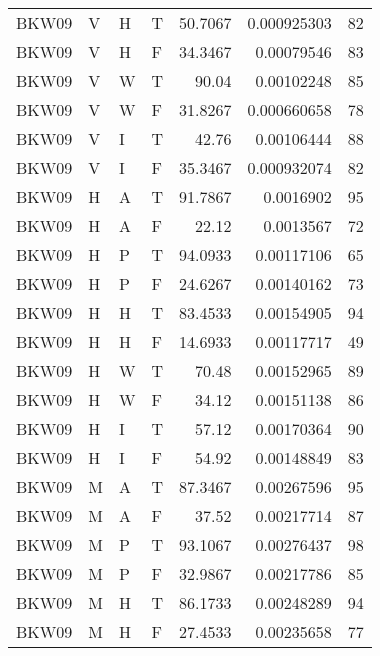 \begin{longtable}{llllrrr}
    BKW09    & V     & H     & T          & 50.7067    & 0.000925303 & 82       \\
    BKW09    & V     & H     & F          & 34.3467    & 0.00079546  & 83       \\
    BKW09    & V     & W     & T          & 90.04      & 0.00102248  & 85       \\
    BKW09    & V     & W     & F          & 31.8267    & 0.000660658 & 78       \\
    BKW09    & V     & I     & T          & 42.76      & 0.00106444  & 88       \\
    BKW09    & V     & I     & F          & 35.3467    & 0.000932074 & 82       \\
    BKW09    & H     & A     & T          & 91.7867    & 0.0016902   & 95       \\
    BKW09    & H     & A     & F          & 22.12      & 0.0013567   & 72       \\
    BKW09    & H     & P     & T          & 94.0933    & 0.00117106  & 65       \\
    BKW09    & H     & P     & F          & 24.6267    & 0.00140162  & 73       \\
    BKW09    & H     & H     & T          & 83.4533    & 0.00154905  & 94       \\
    BKW09    & H     & H     & F          & 14.6933    & 0.00117717  & 49       \\
    BKW09    & H     & W     & T          & 70.48      & 0.00152965  & 89       \\
    BKW09    & H     & W     & F          & 34.12      & 0.00151138  & 86       \\
    BKW09    & H     & I     & T          & 57.12      & 0.00170364  & 90       \\
    BKW09    & H     & I     & F          & 54.92      & 0.00148849  & 83       \\
    BKW09    & M     & A     & T          & 87.3467    & 0.00267596  & 95       \\
    BKW09    & M     & A     & F          & 37.52      & 0.00217714  & 87       \\
    BKW09    & M     & P     & T          & 93.1067    & 0.00276437  & 98       \\
    BKW09    & M     & P     & F          & 32.9867    & 0.00217786  & 85       \\
    BKW09    & M     & H     & T          & 86.1733    & 0.00248289  & 94       \\
    BKW09    & M     & H     & F          & 27.4533    & 0.00235658  & 77       \\

\end{longtable}
